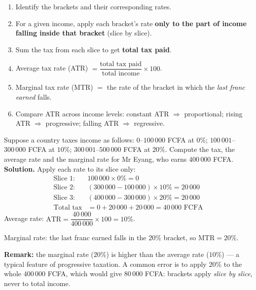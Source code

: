 \documentclass[11pt]{article}
\newcommand{\cle}[1]{{\popxbold\color{popdark}#1}}
\begin{document}
\begin{methode}
\begin{enumerate}
\item Identify the brackets and their corresponding rates.
\item For a given income, apply each bracket's rate \textbf{only to the part of income falling inside that bracket} (slice by slice).
\item Sum the tax from each slice to get \textbf{total tax paid}.
\item \cle{Average tax rate (ATR)} $= \dfrac{\text{total tax paid}}{\text{total income}} \times 100$.
\item \cle{Marginal tax rate (MTR)} $=$ the rate of the bracket in which the \emph{last franc earned} falls.
\item Compare ATR across income levels: constant ATR $\Rightarrow$ proportional; rising ATR $\Rightarrow$ progressive; falling ATR $\Rightarrow$ regressive.
\end{enumerate}
\end{methode}

\begin{exoresolu}
Suppose a country taxes income as follows: $0$--$100\,000$ FCFA at $0\%$; $100\,001$--$300\,000$ FCFA at $10\%$; $300\,001$--$500\,000$ FCFA at $20\%$. Compute the tax, the average rate and the marginal rate for Mr Eyang, who earns $400\,000$ FCFA.
\tcblower
\textbf{Solution.} Apply each rate to its slice only:
\begin{align*}
\text{Slice 1: } & 100\,000 \times 0\% = 0 \\
\text{Slice 2: } & (300\,000 - 100\,000) \times 10\% = 20\,000 \\
\text{Slice 3: } & (400\,000 - 300\,000) \times 20\% = 20\,000 \\
\text{Total tax} &= 0 + 20\,000 + 20\,000 = 40\,000 \text{ FCFA}
\end{align*}
Average rate: $\mathrm{ATR} = \dfrac{40\,000}{400\,000}\times 100 = 10\%$. \par
Marginal rate: the last franc earned falls in the $20\%$ bracket, so $\mathrm{MTR} = 20\%$. \par
\textbf{Remark:} the marginal rate ($20\%$) is higher than the average rate ($10\%$) --- a typical feature of progressive taxation. A common error is to apply $20\%$ to the whole $400\,000$ FCFA, which would give $80\,000$ FCFA: brackets apply \emph{slice by slice}, never to total income.
\end{exoresolu}
\end{document}
